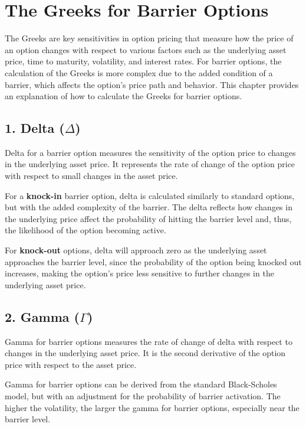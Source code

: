 \chapter{The Greeks for Barrier Options}
\label{sec:greeks}

The Greeks are key sensitivities in option pricing that measure how the price of an option changes with respect to various factors such as the underlying asset price, time to maturity, volatility, and interest rates. For barrier options, the calculation of the Greeks is more complex due to the added condition of a barrier, which affects the option's price path and behavior. This chapter provides an explanation of how to calculate the Greeks for barrier options.

\section*{1. Delta (\(\Delta\))}

Delta for a barrier option measures the sensitivity of the option price to changes in the underlying asset price. It represents the rate of change of the option price with respect to small changes in the asset price. 

For a \textbf{knock-in} barrier option, delta is calculated similarly to standard options, but with the added complexity of the barrier. The delta reflects how changes in the underlying price affect the probability of hitting the barrier level and, thus, the likelihood of the option becoming active.

For \textbf{knock-out} options, delta will approach zero as the underlying asset approaches the barrier level, since the probability of the option being knocked out increases, making the option's price less sensitive to further changes in the underlying asset price.

\section*{2. Gamma (\(\Gamma\))}

Gamma for barrier options measures the rate of change of delta with respect to changes in the underlying asset price. It is the second derivative of the option price with respect to the asset price. 

Gamma for barrier options can be derived from the standard Black-Scholes model, but with an adjustment for the probability of barrier activation. The higher the volatility, the larger the gamma for barrier options, especially near the barrier level.

